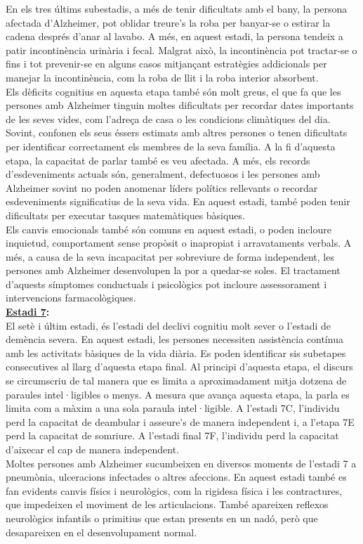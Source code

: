 \documentclass[a4paper,12pt]{article}
\begin{document}
En els tres últims subestadis, a més de tenir dificultats amb el bany, la persona afectada d'Alzheimer, pot oblidar treure's la roba per banyar-se o estirar la cadena després d'anar al lavabo. A més, en aquest estadi, la persona tendeix a patir incontinència urinària i fecal. Malgrat això, la incontinència pot tractar-se o fins i tot prevenir-se en alguns casos mitjançant estratègies addicionals per manejar la incontinència, com la roba de llit i la roba interior absorbent.\\
Els dèficits cognitius en aquesta etapa també són molt greus, el que fa que les persones amb Alzheimer tinguin moltes dificultats per recordar dates importants de les seves vides, com l'adreça de casa o les condicions climàtiques del dia. Sovint, confonen els seus éssers estimats amb altres persones o tenen dificultats per identificar correctament els membres de la seva família. A la fi d'aquesta etapa, la capacitat de parlar també es veu afectada. A més, els records d'esdeveniments actuals són, generalment, defectuosos i les persones amb Alzheimer sovint no poden anomenar líders polítics rellevants o recordar esdeveniments significatius de la seva vida. En aquest estadi, també poden tenir dificultats per executar tasques matemàtiques bàsiques.\\
Els canvis emocionals també són comuns en aquest estadi, o  poden incloure inquietud, comportament sense propòsit o inapropiat i  arravataments verbals. A més, a causa de la seva incapacitat per sobreviure de forma independent, les persones amb Alzheimer desenvolupen la por a quedar-se soles. El tractament d'aquests símptomes conductuals i psicològics pot incloure assessorament i intervencions farmacològiques.\\
\textbf{\underline{Estadi 7}:}\\
El setè i últim estadi, és l'estadi del declivi cognitiu molt sever o l'estadi de demència severa. En aquest estadi, les persones necessiten assistència contínua amb les activitats bàsiques de la vida diària. Es poden identificar sis subetapes consecutives al llarg d'aquesta etapa final. Al principi d'aquesta etapa, el discurs se circumscriu de tal manera que es limita a aproximadament mitja dotzena de paraules intel·ligibles o menys. A mesura que avança aquesta etapa, la parla es limita com a màxim a una sola paraula intel·ligible. A l'estadi 7C, l'individu perd la capacitat de deambular i asseure's de manera independent i, a l'etapa 7E perd la capacitat de somriure. A l'estadi final 7F, l'individu perd la capacitat d'aixecar el cap de manera independent.\\
Moltes persones amb Alzheimer sucumbeixen en diversos moments de l'estadi 7 a pneumònia, ulceracions infectades o altres afeccions. En aquest estadi també es fan evidents canvis físics i neurològics, com la rigidesa física i les contractures, que impedeixen el moviment de les articulacions. També apareixen reflexos neurològics infantils o primitius que estan presents en un nadó, però que desapareixen en el desenvolupament normal.
\end{document}
